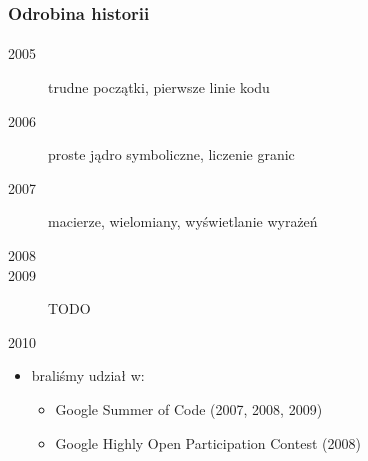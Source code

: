 \documentclass{beamer}
\begin{document}
\begin{frame}
    \frametitle{Odrobina historii}
    \framesubtitle{}

    \begin{description}
        \item[2005] trudne początki, pierwsze linie kodu
        \item[2006] proste jądro symboliczne, liczenie granic
        \item[2007] macierze, wielomiany, wyświetlanie wyrażeń
        \item[2008]
        \item[2009] TODO
        \item[2010]
    \end{description}

    \begin{itemize}
        \item braliśmy udział w:
            \begin{itemize}
                \item Google Summer of Code (2007, 2008, 2009)
                \item Google Highly Open Participation Contest (2008)
            \end{itemize}
    \end{itemize}
\end{frame}
\end{document}
